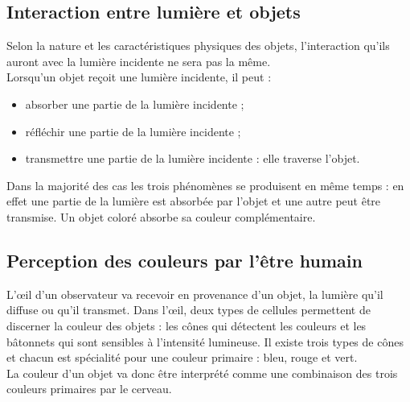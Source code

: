 \documentclass[a4paper,11pt,fleqn]{article}%
\begin{document}
    \subsection{Interaction entre lumière et objets}
    \begin{minipage}
        {0.68\textwidth}
        Selon la nature et les caractéristiques physiques des objets, l'interaction qu'ils auront avec la lumière incidente ne sera pas la même.\\
        Lorsqu'un objet reçoit une lumière incidente, il peut :
        \begin{itemize}
            \item absorber une partie de la lumière incidente ;
            \item réfléchir une partie de la lumière incidente ;
            \item transmettre une partie de la lumière incidente : elle traverse l'objet.
        \end{itemize}
        Dans la majorité des cas les trois phénomènes se produisent en même temps : en effet une partie de la lumière est absorbée par l'objet et une autre peut être transmise. Un objet coloré absorbe sa couleur complémentaire.
    \end{minipage}
    \begin{minipage}
        {0.3\textwidth}
        \begin{center}
        \end{center}
    \end{minipage}
    \subsection{Perception des couleurs par l'être humain}
    L'\oe il d'un observateur va recevoir en provenance d'un objet, la lumière qu'il diffuse ou qu'il transmet. Dans l'\oe il, deux types de cellules permettent de discerner la couleur des objets :  les cônes qui détectent les couleurs et les bâtonnets qui sont sensibles à l'intensité lumineuse. Il existe trois types de cônes et chacun est spécialité pour une couleur primaire : bleu, rouge et vert.\\
    La couleur d'un objet va donc être interprété comme une combinaison des trois couleurs primaires par le cerveau.
\end{document}
